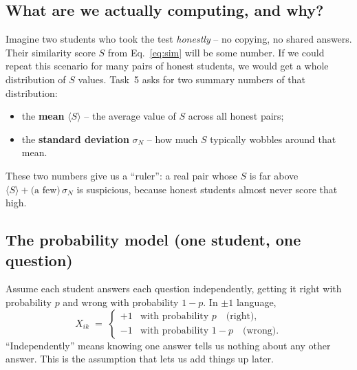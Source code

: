 \documentclass[11pt,a4paper]{article}
\begin{document}
\subsection{What are we actually computing, and why?}
Imagine two students who took the test \emph{honestly} -- no copying,
no shared answers. Their similarity score $S$ from Eq.~\eqref{eq:sim}
will be some number. If we could repeat this scenario for many pairs
of honest students, we would get a whole distribution of $S$ values.
Task~5 asks for two summary numbers of that distribution:
\begin{itemize}[leftmargin=2em,nosep]
  \item the \textbf{mean} $\langle S\rangle$ -- the average value of
        $S$ across all honest pairs;
  \item the \textbf{standard deviation} $\sigma_N$ -- how much $S$
        typically wobbles around that mean.
\end{itemize}
These two numbers give us a ``ruler'': a real pair whose $S$ is far
above $\langle S\rangle + \text{(a few)}\,\sigma_N$ is suspicious,
because honest students almost never score that high.

\subsection{The probability model (one student, one question)}
Assume each student answers each question independently, getting it
right with probability $p$ and wrong with probability $1-p$. In
$\pm 1$ language,
\begin{equation}
  X_{ik} \;=\;
  \begin{cases}
    +1 & \text{with probability }p \quad\text{(right)},\\
    -1 & \text{with probability }1-p \quad\text{(wrong)}.
  \end{cases}
  \label{eq:null}
\end{equation}
``Independently'' means knowing one answer tells us nothing about
any other answer. This is the assumption that lets us add things up
later.
\end{document}
